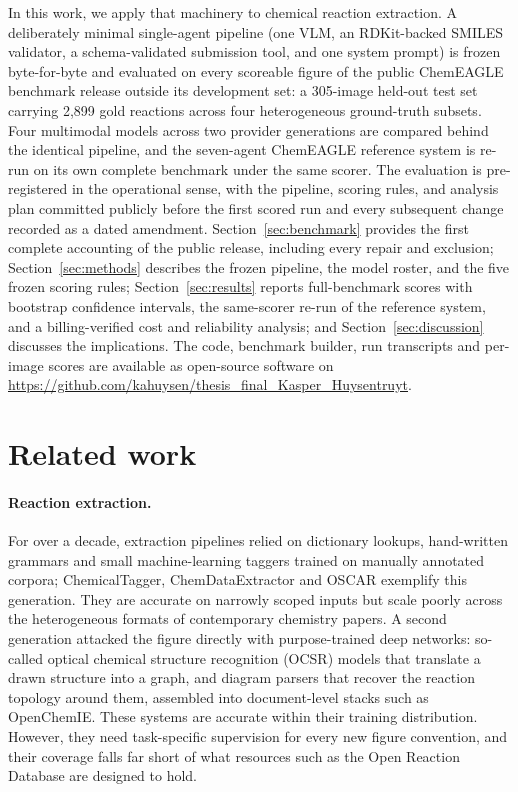 \documentclass{article}
\begin{document}
In this work, we apply that machinery to chemical reaction extraction.
A deliberately minimal single-agent pipeline (one VLM, an RDKit-backed
SMILES validator, a schema-validated submission tool, and one system
prompt) is frozen byte-for-byte and evaluated on every scoreable figure
of the public ChemEAGLE benchmark release outside its development set:
a 305-image held-out test set carrying 2{,}899 gold reactions across
four heterogeneous ground-truth subsets. Four multimodal models across
two provider generations are compared behind the identical pipeline,
and the seven-agent ChemEAGLE reference system is re-run on its own
complete benchmark under the same scorer. The evaluation is
pre-registered in the operational sense, with the pipeline, scoring
rules, and analysis plan committed publicly before the first scored
run and every subsequent change recorded as a dated amendment.
Section~\ref{sec:benchmark} provides the first complete accounting of
the public release, including every repair and exclusion;
Section~\ref{sec:methods} describes the frozen pipeline, the model
roster, and the five frozen scoring rules;
Section~\ref{sec:results} reports full-benchmark scores with bootstrap
confidence intervals, the same-scorer re-run of the reference system,
and a billing-verified cost and reliability analysis; and
Section~\ref{sec:discussion} discusses the implications. The code,
benchmark builder, run transcripts and per-image scores are available
as open-source software on
\url{https://github.com/kahuysen/thesis_final_Kasper_Huysentruyt}.

\section{Related work}
\label{sec:related}

\paragraph{Reaction extraction.} For over a decade, extraction
pipelines relied on dictionary lookups, hand-written grammars and small
machine-learning taggers trained on manually annotated corpora;
ChemicalTagger, ChemDataExtractor and OSCAR exemplify this
generation.\citep{Hawizy2011,Mavracic2021,Jessop2011} They are accurate
on narrowly scoped inputs but scale poorly across the heterogeneous
formats of contemporary chemistry papers. A second generation attacked
the figure directly with purpose-trained deep networks: so-called
optical chemical structure recognition (OCSR) models that translate a
drawn structure into a
graph,\citep{Qian2023MolScribe,Chen2024MolNexTR,Rajan2023DECIMERai}
and diagram parsers that recover the reaction topology around
them,\citep{Qian2023,Wilary2023RDE} assembled into document-level stacks
such as OpenChemIE.\citep{Fan2024OpenChemIE} These systems are accurate
within their training distribution. However, they need task-specific
supervision for every new figure convention, and their coverage falls
far short of what resources such as the Open Reaction Database are
designed to hold.\citep{Kearnes2021ORD}
\end{document}
